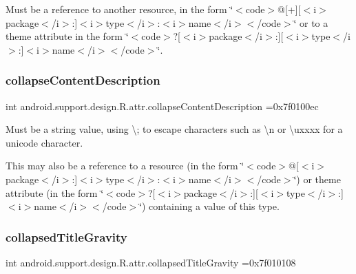 Must be a reference to another resource, in the form \char`\"{}$<$code$>$@\mbox{[}+\mbox{]}\mbox{[}$<$i$>$package$<$/i$>$\+:\mbox{]}$<$i$>$type$<$/i$>$\+:$<$i$>$name$<$/i$>$$<$/code$>$\char`\"{} or to a theme attribute in the form \char`\"{}$<$code$>$?\mbox{[}$<$i$>$package$<$/i$>$\+:\mbox{]}\mbox{[}$<$i$>$type$<$/i$>$\+:\mbox{]}$<$i$>$name$<$/i$>$$<$/code$>$\char`\"{}. \mbox{\label{classandroid_1_1support_1_1design_1_1R_1_1attr_aa5754fb1f9395624cc050bbc138cd96d}} 
\subsubsection{\texorpdfstring{collapse\+Content\+Description}{collapseContentDescription}}
{\footnotesize\ttfamily int android.\+support.\+design.\+R.\+attr.\+collapse\+Content\+Description =0x7f0100ec\hspace{0.3cm}{\ttfamily [static]}}

Must be a string value, using \textquotesingle{}\textbackslash{};\textquotesingle{} to escape characters such as \textquotesingle{}\textbackslash{}n\textquotesingle{} or \textquotesingle{}\textbackslash{}uxxxx\textquotesingle{} for a unicode character. 

This may also be a reference to a resource (in the form \char`\"{}$<$code$>$@\mbox{[}$<$i$>$package$<$/i$>$\+:\mbox{]}$<$i$>$type$<$/i$>$\+:$<$i$>$name$<$/i$>$$<$/code$>$\char`\"{}) or theme attribute (in the form \char`\"{}$<$code$>$?\mbox{[}$<$i$>$package$<$/i$>$\+:\mbox{]}\mbox{[}$<$i$>$type$<$/i$>$\+:\mbox{]}$<$i$>$name$<$/i$>$$<$/code$>$\char`\"{}) containing a value of this type. \mbox{\label{classandroid_1_1support_1_1design_1_1R_1_1attr_accb70e3f5023e816de65788d2484b73b}} 
\subsubsection{\texorpdfstring{collapsed\+Title\+Gravity}{collapsedTitleGravity}}
{\footnotesize\ttfamily int android.\+support.\+design.\+R.\+attr.\+collapsed\+Title\+Gravity =0x7f010108\hspace{0.3cm}{\ttfamily [static]}}

